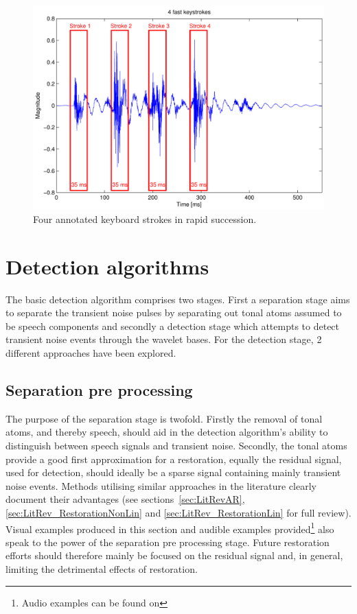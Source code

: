 \begin{figure}[!] %
\centering
\includegraphics[width=120mm]{Keyboard4StrokesFast.pdf}
\caption{Four annotated keyboard strokes in rapid succession.}\label{fig:Keyboard4StrokesFast}
\end{figure}

\section{Detection algorithms}\label{sec:WPdetection}
The basic detection algorithm comprises two stages. First a separation stage aims to separate the transient noise pulses by separating out tonal atoms assumed to be speech components and secondly a detection stage which attempts to detect transient noise events through the wavelet bases. For the detection stage, 2 different approaches have been explored.

\subsection{Separation pre processing}\label{sec:WPseparation}
The purpose of the separation stage is twofold. Firstly the removal of tonal atoms, and thereby speech, should aid in the detection algorithm's ability to distinguish between speech signals and transient noise. Secondly, the tonal atoms provide a good first approximation for a restoration, equally the residual signal, used for detection, should ideally be a sparse signal containing mainly transient noise events. Methods utilising similar approaches in the literature clearly document their advantages \cite{Godsill1998book} (see sections~\ref{sec:LitRevAR}, \ref{sec:LitRev_RestorationNonLin} and \ref{sec:LitRev_RestorationLin} for full review). Visual examples produced in this section and audible examples provided\footnote{Audio examples can be found on \siteURL} also speak to the power of the separation pre processing stage.
Future restoration efforts should therefore mainly be focused on the residual signal and, in general, limiting the detrimental effects of restoration.

